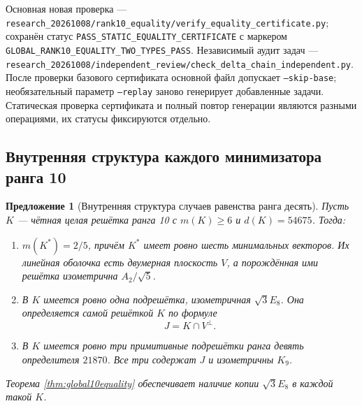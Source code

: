 \documentclass[11pt,a4paper]{article}
\newtheorem{proposition}[theorem]{Предложение}
\theoremstyle{remark}\newtheorem{remark}[theorem]{Замечание}
\newcommand{\file}[1]{{\small\nolinkurl{#1}}}
\begin{document}
Основная новая проверка --- \file{research_20261008/rank10_equality/verify_equality_certificate.py}; сохранён статус \file{PASS_STATIC_EQUALITY_CERTIFICATE} с маркером \file{GLOBAL_RANK10_EQUALITY_TWO_TYPES_PASS}. Независимый аудит задач --- \file{research_20261008/independent_review/check_delta_chain_independent.py}. После проверки базового сертификата основной файл допускает \texttt{--skip-base}; необязательный параметр \texttt{--replay} заново генерирует добавленные задачи. Статическая проверка сертификата и полный повтор генерации являются разными операциями, их статусы фиксируются отдельно.


\subsection{Внутренняя структура каждого минимизатора ранга 10}


\begin{proposition}[Внутренняя структура случаев равенства ранга десять]
\label{prop:intrinsic-rank-ten}
Пусть $K$ --- чётная целая решётка ранга 10 с $m(K)\ge6$ и $d(K)=54675$. Тогда:
\begin{enumerate}
\item $m(K^*)=2/5$, причём $K^*$ имеет ровно шесть минимальных векторов.
      Их линейная оболочка есть двумерная плоскость $V$, а порождённая
      ими решётка изометрична $A_2/\sqrt5$.
\item В $K$ имеется ровно одна подрешётка, изометричная $\sqrt3E_8$.
      Она определяется самой решёткой $K$ по формуле
      \[
        J=K\cap V^\perp.
      \]
\item В $K$ имеется ровно три примитивные подрешётки ранга девять
      определителя $21870$. Все три содержат $J$ и изометричны $K_9$.
\end{enumerate}
Теорема \ref{thm:global10equality} обеспечивает наличие копии $\sqrt3E_8$ в каждой такой $K$.
\end{proposition}
\end{document}
